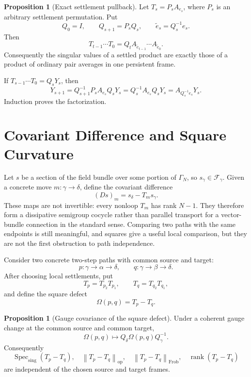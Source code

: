 \documentclass[11pt]{article}
\makeatletter
\newcommand{\G}{\Gamma}
\newcommand{\F}{\mathcal F}
\newcommand{\norm}[1]{\left\|#1\right\|}
\newcommand{\Specsing}{\operatorname{Spec}_{\mathrm{sing}}}
\newcommand{\rank}{\operatorname{rank}}
\theoremstyle{definition}
\newtheorem{proposition}[theorem]{Proposition}
\renewenvironment{proof}[1][\proofname]{\par
  \pushQED{\qed}%
  \normalfont \topsep6\p@\@plus6\p@\relax
  \trivlist
  \item[\hskip\labelsep\bfseries #1\@addpunct{.}]\ignorespaces
}{%
  \popQED\endtrivlist\@endpefalse
}
\makeatother
\begin{document}
\begin{proposition}[Exact settlement pullback]
Let $T_s=P_sA_{e_s}$, where $P_s$ is an arbitrary settlement permutation.  Put
\[
    Q_0=I,\qquad Q_{s+1}=P_sQ_s,
    \qquad \widetilde e_s=Q_s^{-1}e_s.
\]
Then
\[
    T_{t-1}\cdots T_0
    =Q_tA_{\widetilde e_{t-1}}\cdots A_{\widetilde e_0}.
\]
Consequently the singular values of a settled product are exactly those of a
product of ordinary pair averages in one persistent frame.
\end{proposition}

\begin{proof}
If $T_{s-1}\cdots T_0=Q_sY_s$, then
\[
    Y_{s+1}=Q_{s+1}^{-1}P_sA_{e_s}Q_sY_s
           =Q_s^{-1}A_{e_s}Q_sY_s
           =A_{Q_s^{-1}e_s}Y_s.
\]
Induction proves the factorization.
\end{proof}

\section{Covariant Difference and Square Curvature}

Let $s$ be a section of the field bundle over some portion of $\G_N$, so
$s_\gamma\in\F_\gamma$.  Given a concrete move $m:\gamma\to\delta$, define the
covariant difference
\[
    (Ds)_m=s_\delta-T_m s_\gamma.
\]
These maps are not invertible: every nonloop $T_m$ has rank $N-1$.  They
therefore form a dissipative semigroup cocycle rather than parallel transport
for a vector-bundle connection in the standard sense.  Comparing two paths
with the same endpoints is still meaningful, and squares give a useful local
comparison, but they are not the first obstruction to path independence.

Consider two concrete two-step paths with common source and target:
\[
    p:\gamma\to\alpha\to\delta,
    \qquad
    q:\gamma\to\beta\to\delta.
\]
After choosing local settlements, put
\[
    T_p=T_{p_2}T_{p_1},
    \qquad
    T_q=T_{q_2}T_{q_1},
\]
and define the square defect
\[
    \Omega(p,q)=T_p-T_q.
\]

\begin{proposition}[Gauge covariance of the square defect]
Under a coherent gauge change at the common source and common target,
\[
    \Omega(p,q)\mapsto Q_\delta\Omega(p,q)Q_\gamma^{-1}.
\]
Consequently
\[
    \Specsing(T_p-T_q),
    \quad
    \norm{T_p-T_q}_{\mathrm{op}},
    \quad
    \norm{T_p-T_q}_{\mathrm{Frob}},
    \quad
    \rank(T_p-T_q)
\]
are independent of the chosen source and target frames.
\end{proposition}
\end{document}
